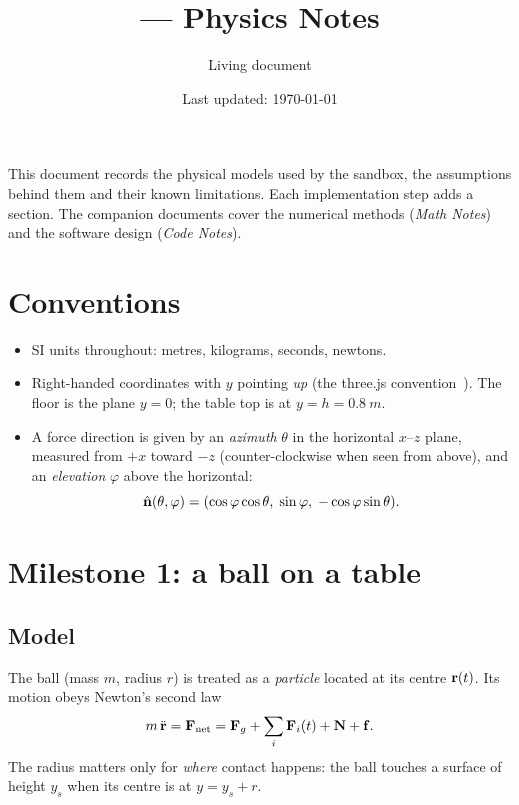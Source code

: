 \documentclass[11pt]{article}
\title{\project{} --- Physics Notes}
\author{Living document}
\date{Last updated: \today}
\begin{document}
\maketitle
\noindent This document records the physical models used by the sandbox, the
assumptions behind them and their known limitations. Each implementation step
adds a section. The companion documents cover the numerical methods
(\emph{Math Notes}) and the software design (\emph{Code Notes}).

\tableofcontents

\section{Conventions}
\begin{itemize}
  \item SI units throughout: metres, kilograms, seconds, newtons.
  \item Right-handed coordinates with $y$ pointing \emph{up} (the three.js
        convention~\cite{threejs}). The floor is the plane $y=0$; the table top is
        at $y=h=\SI{0.8}{m}$.
  \item A force direction is given by an \emph{azimuth} $\theta$ in the horizontal
        $x$--$z$ plane, measured from $+x$ toward $-z$ (counter-clockwise when seen
        from above), and an \emph{elevation} $\varphi$ above the horizontal:
        \begin{equation}
          \hat{\mathbf{n}}(\theta,\varphi) = (\cos\varphi\cos\theta,\; \sin\varphi,\; -\cos\varphi\sin\theta).
          \label{eq:dir}
        \end{equation}
\end{itemize}

\section{Milestone 1: a ball on a table}

\subsection{Model}
The ball (mass $m$, radius $r$) is treated as a \emph{particle} located at its
centre $\mathbf{r}(t)$. Its motion obeys Newton's second law~\cite{halliday2013,kleppner2014}
\begin{equation}
  m\,\ddot{\mathbf{r}} = \mathbf{F}_\text{net} = \mathbf{F}_g + \sum_i \mathbf{F}_i(t) + \mathbf{N} + \mathbf{f}.
\end{equation}
The radius matters only for \emph{where} contact happens: the ball touches a
surface of height $y_s$ when its centre is at $y = y_s + r$.
\end{document}
